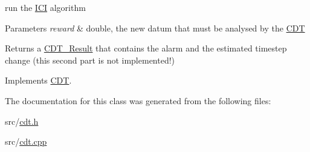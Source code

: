 run the \mbox{\hyperlink{class_i_c_i}{I\+CI}} algorithm 


\begin{DoxyParams}{Parameters}
{\em reward} & double, the new datum that must be analysed by the \mbox{\hyperlink{class_c_d_t}{C\+DT}} \\
\hline
\end{DoxyParams}
\begin{DoxyReturn}{Returns}
a \mbox{\hyperlink{class_c_d_t___result}{C\+D\+T\+\_\+\+Result}} that contains the alarm and the estimated timestep change (this second part is not implemented!) 
\end{DoxyReturn}


Implements \mbox{\hyperlink{class_c_d_t_a2493aeb166403f448ec689d2f7b85dbc}{C\+DT}}.



The documentation for this class was generated from the following files\+:\begin{DoxyCompactItemize}
\item 
src/\mbox{\hyperlink{cdt_8h}{cdt.\+h}}\item 
src/\mbox{\hyperlink{cdt_8cpp}{cdt.\+cpp}}\end{DoxyCompactItemize}
